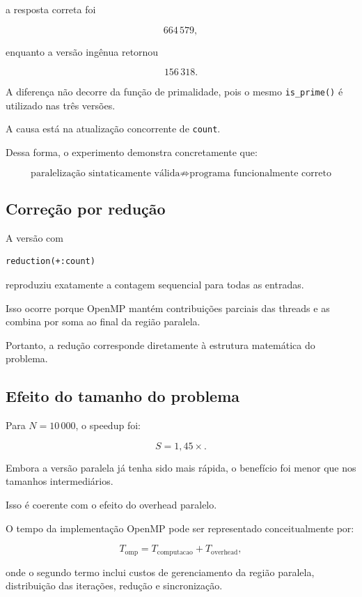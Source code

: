 a resposta correta foi

\[
664\,579,
\]

enquanto a versão ingênua retornou

\[
156\,318.
\]

A diferença não decorre da função de primalidade, pois o mesmo
\texttt{is\_prime()} é utilizado nas três versões.

A causa está na atualização concorrente de \texttt{count}.

Dessa forma, o experimento demonstra concretamente que:

\[
\boxed{
\text{paralelização sintaticamente válida}
\not\Rightarrow
\text{programa funcionalmente correto}
}
\]


\subsection{Correção por redução}

A versão com

\begin{verbatim}
reduction(+:count)
\end{verbatim}

reproduziu exatamente a contagem sequencial para todas as entradas.

Isso ocorre porque OpenMP mantém contribuições parciais das threads e as
combina por soma ao final da região paralela.

Portanto, a redução corresponde diretamente à estrutura matemática do
problema.


\subsection{Efeito do tamanho do problema}

Para \(N=10\,000\), o speedup foi:

\[
S=1,45\times.
\]

Embora a versão paralela já tenha sido mais rápida, o benefício foi menor
que nos tamanhos intermediários.

Isso é coerente com o efeito do overhead paralelo.

O tempo da implementação OpenMP pode ser representado conceitualmente por:

\[
T_{\mathrm{omp}}
=
T_{\mathrm{computacao}}
+
T_{\mathrm{overhead}},
\]

onde o segundo termo inclui custos de gerenciamento da região paralela,
distribuição das iterações, redução e sincronização.


